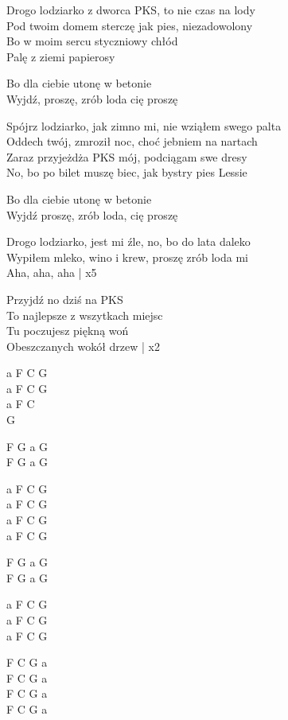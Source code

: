 \begin{text}
    Drogo lodziarko z dworca PKS, to nie czas na lody\\
    Pod twoim domem sterczę jak pies, niezadowolony\\
    Bo w moim sercu styczniowy chłód\\
	Palę z ziemi papierosy 

    \vin Bo dla ciebie utonę w betonie\\
    \vin Wyjdź, proszę, zrób loda cię proszę  

    Spójrz lodziarko, jak zimno mi, nie wziąłem swego palta\\
    Oddech twój, zmroził noc, choć jebniem na nartach\\
    Zaraz przyjeżdża PKS mój, podciągam swe dresy\\
    No, bo po bilet muszę biec, jak bystry pies Lessie

    \vin Bo dla ciebie utonę w betonie\\
    \vin Wyjdź proszę, zrób loda, cię proszę

    Drogo lodziarko, jest mi źle, no, bo do lata daleko\\
    Wypiłem mleko, wino i krew, proszę zrób loda mi\\
    Aha, aha, aha | x5

    Przyjdź no dziś na PKS\\ 
    To najlepsze z wszytkach miejsc\\
    Tu poczujesz piękną woń\\
    Obeszczanych wokół drzew | x2
\end{text}
\begin{chord}
    a F C G\\
    a F C G\\ 
    a F C\\
    G 

    F G a G \\
    F G a G 

    a F C G\\
    a F C G\\
	a F C G\\ 
    a F C G 
	
    F G a G \\
    F G a G 

    a F C G\\
	a F C G\\
	a F C G
	
    F C G a\\ 
    F C G a\\ 
    F C G a\\
    F C G a
\end{chord}